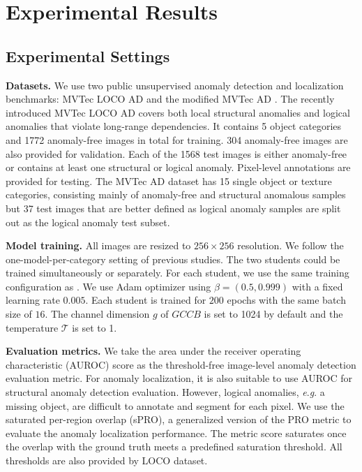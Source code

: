 \documentclass[10pt,twocolumn,letterpaper]{article}
\begin{document}
\section{Experimental Results}
\subsection{Experimental Settings}
\textbf{Datasets.} We use two public unsupervised anomaly detection and localization benchmarks: MVTec LOCO AD \cite{bergmann2022beyond} and the modified MVTec AD \cite{bergmann2019mvtec}. The recently introduced MVTec LOCO AD covers both local structural anomalies and logical anomalies that violate long-range dependencies. It contains 5 object categories and 1772 anomaly-free images in total for training. 304 anomaly-free images are also provided for validation. Each of the 1568 test images is either anomaly-free or contains at least one structural or logical anomaly. Pixel-level annotations are provided for testing. The MVTec AD dataset has 15 single object or texture categories, consisting mainly of anomaly-free and structural anomalous samples but 37 test images that are better defined as logical anomaly samples \cite{bergmann2022beyond} are split out as the logical anomaly test subset. \par


\textbf{Model training.} All images are resized to $256 \times 256$ resolution. We follow the one-model-per-category setting of previous studies. The two students could be trained simultaneously or separately. For each student, we use the same training configuration as \cite{deng2022anomaly}. We use Adam optimizer using $\beta=(0.5,0.999)$ with a fixed learning rate $0.005$. Each student is trained for $200$ epochs with the same batch size of $16$. The channel dimension $g$ of $GCCB$ is set to 1024 by default and the temperature $\mathcal{T}$ is set to 1.\par

\textbf{Evaluation metrics.} We take the area under the receiver operating characteristic (AUROC) score as the threshold-free image-level anomaly detection evaluation metric. For anomaly localization, it is also suitable to use AUROC for structural anomaly detection evaluation. However, logical anomalies, {\textit{e}.\textit{g}.} a missing object, are difficult to annotate and segment for each pixel. We use the saturated per-region overlap (sPRO)\cite{bergmann2022beyond}, a generalized version of the PRO metric \cite{bergmann2019mvtec} to evaluate the anomaly localization performance. The metric score saturates once the overlap with the ground truth meets a predefined saturation threshold. All thresholds are also provided by LOCO dataset.
\end{document}
